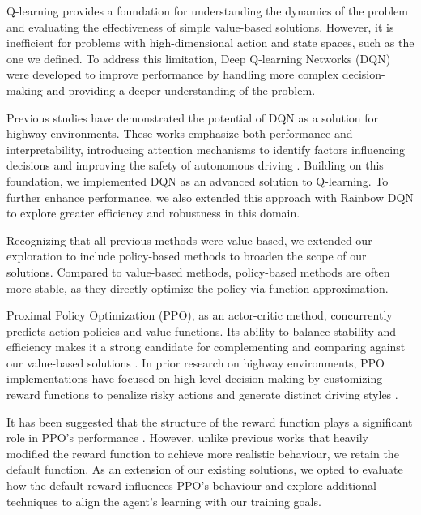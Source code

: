 \documentclass{article}
\begin{document}

Q-learning provides a foundation for understanding the dynamics of the problem and evaluating the effectiveness of simple value-based solutions. However, it is inefficient for problems with high-dimensional action and state spaces, such as the one we defined. To address this limitation, Deep Q-learning Networks (DQN) were developed to improve performance by handling more complex decision-making and providing a deeper understanding of the problem.


Previous studies have demonstrated the potential of DQN as a solution for highway environments. These works emphasize both performance and interpretability, introducing attention mechanisms to identify factors influencing decisions and improving the safety of autonomous driving \cite{leurent_social_2019, bellotti_explaining_2023, bellotti_designing_2023}.
Building on this foundation, we implemented DQN as an advanced solution to Q-learning. To further enhance performance, we also extended this approach with Rainbow DQN to explore greater efficiency and robustness in this domain.


Recognizing that all previous methods were value-based, we extended our exploration to include policy-based methods to broaden the scope of our solutions. Compared to value-based methods, policy-based methods are often more stable, as they directly optimize the policy via function approximation.

Proximal Policy Optimization (PPO), as an actor-critic method, concurrently predicts action policies and value functions. Its ability to balance stability and efficiency makes it a strong candidate for complementing and comparing against our value-based solutions \cite{schulman_proximal_2017}.
In prior research on highway environments, PPO implementations have focused on high-level decision-making by customizing reward functions to penalize risky actions and generate distinct driving styles \citep{pighetti_high-level_2022, forneris_implementing_2023, capello_investigating_2023}.

It has been suggested that the structure of the reward function plays a significant role in PPO's performance \cite{kozlica_deep_2023}. However, unlike previous works that heavily modified the reward function to achieve more realistic behaviour, we retain the default function. As an extension of our existing solutions, we opted to evaluate how the default reward influences PPO's behaviour and explore additional techniques to align the agent's learning with our training goals.  
\end{document}
